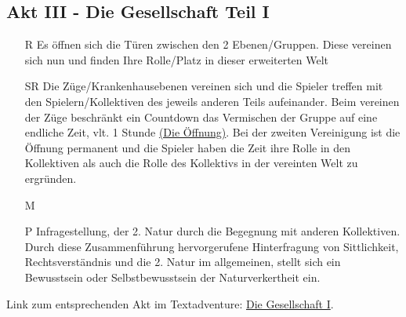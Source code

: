 \documentclass[12pt, a4paper, openany]{report}
\begin{document}
\subsection{Akt III - Die Gesellschaft Teil I}
\begin{itemize}
\item[R] Es \"offnen sich die T\"uren zwischen den 2 Ebenen/Gruppen. Diese vereinen sich nun und finden Ihre Rolle/Platz in dieser erweiterten \glqq Welt\grqq{}
\item[SR] Die Z\"uge/Krankenhausebenen vereinen sich und die Spieler treffen mit den Spielern/Kollektiven des jeweils anderen Teils aufeinander. 
Beim vereinen der Z\"uge beschr\"ankt ein Countdown das Vermischen der Gruppe auf eine endliche Zeit, vlt. 1 Stunde \hyperref[die-öffnung]{(Die Öffnung)}. 
Bei der zweiten Vereinigung ist die \"Offnung permanent und die Spieler haben die Zeit ihre Rolle in den Kollektiven als auch die Rolle des Kollektivs in der vereinten Welt zu ergr\"unden.
\item[M]
\item[P] Infragestellung, der 2. Natur durch die Begegnung mit anderen Kollektiven.
Durch diese Zusammenf\"uhrung hervorgerufene Hinterfragung von Sittlichkeit, Rechtsverst\"andnis und die 2. Natur im allgemeinen, stellt sich ein Bewusstsein oder Selbstbewusstsein der Naturverkertheit ein. 
\end{itemize}
Link zum entsprechenden Akt im Textadventure: \hyperref[die-gesellschaft]{Die Gesellschaft I}.
\end{document}
